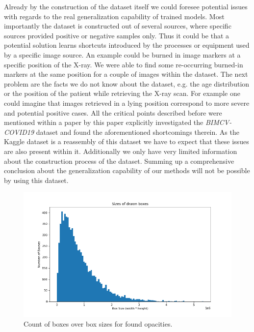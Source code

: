 Already by the construction of the dataset itself we could foresee potential issues with regards to the real generalization capability of trained models. Most importantly the dataset is constructed out of several sources, where specific sources provided positive or negative samples only. Thus it could be that a potential solution learns shortcuts introduced by the processes or equipment used by a specific image source. An example could be burned in image markers at a specific position of the X-ray. We were able to find some re-occurring burned-in markers at the same position for a couple of images within the dataset. The next problem are the facts we do not know about the dataset, e.g. the age distribution or the position of the patient while retrieving the X-ray scan. For example one could imagine that images retrieved in a lying position correspond to more severe and potential positive cases. All the critical points described before were mentioned within a paper by \citeauthor{degrave2021ai} \autocite{degrave2021ai} this paper explicitly investigated the \textit{BIMCV-COVID19} dataset and found the aforementioned shortcomings therein. As the Kaggle dataset is a reassembly of this dataset we have to expect that these issues are also present within it. Additionally we only have very limited information about the construction process of the dataset. Summing up a comprehensive conclusion about the generalization capability of our methods will not be possible by using this dataset.

\begin{figure}
	\centering
	\includegraphics[width=0.75\linewidth]{img/box_size_distribution.png}
	\caption{Count of boxes over box sizes for found opacities.}
	\label{fig:box-sizes}
\end{figure}

